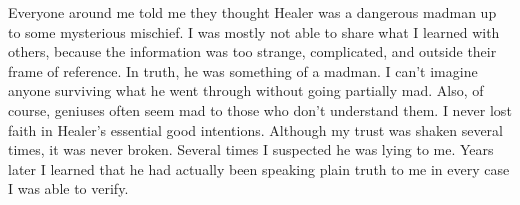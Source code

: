 Everyone around me told me they thought Healer was a dangerous madman up to some mysterious mischief. I was mostly not able to share what I learned with others, because the information was too strange, complicated, and outside their frame of reference. In truth, he was something of a madman. I can't imagine anyone surviving what he went through without going partially mad. Also, of course, geniuses often seem mad to those who don't understand them. I never lost faith in Healer's essential good intentions. Although my trust was shaken several times, it was never broken. Several times I suspected he was lying to me. Years later I learned that he had actually been speaking plain truth to me in every case I was able to verify.

\chapterreturn
